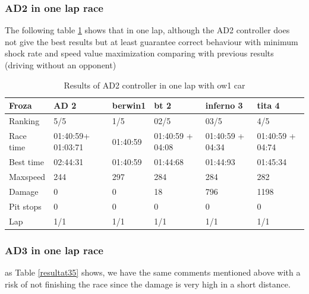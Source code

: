\documentclass{llncs}
\begin{document}
\subsubsection{AD2 in one lap race}	
The following table \ref{resultat32} shows that in one lap, although the AD2 controller does not give the best results but at least guarantee correct behaviour with minimum shock rate and speed value maximization comparing with previous results (driving without an opponent)
\begin{table}[h!]
	\caption{Results of AD2 controller in one lap with ow1 car}
	\label{resultat32}
	\begin{tabular}{ |p{3cm}|p{2cm}|p{2cm}|p{2 cm}|p{2 cm}|p{2 cm}|}
		\hline
		{ \color{blue}\textbf{Froza} }&
		{ \color{red} \textbf{ AD 2} } &
		{ \color{red}\textbf{ berwin1 }}&  
		{ \color{red} \textbf{bt 2 } } &
		
		{ \color{red} \textbf{inferno 3} }
		&{ \color{red} \textbf{tita 4} }
		\\
		\hline
		Ranking  & 5/5  & 1/5 & 02/5 & 03/5& 4/5
		\\
		\hline
		Race time &  01:40:59+ 01:03:71 & 01:40:59  &  01:40:59 + 04:08  &  01:40:59 + 04:34 &   01:40:59 + 04:74 
		\\
		\hline
		Best time & 02:44:31 &  01:40:59 & 01:44:68 & 01:44:93& 01:45:34
		\\
		\hline 
		Maxspeed & 244  & 297 & 284 & 284 & 282
		\\
		\hline
		
		Damage & 0 & 0 & 18 & 796 & 1198
		\\
		\hline 
		
		
		Pit stops & 0 & 0 & 0 & 0 & 0
		\\
		\hline 
		Lap & 1/1 & 1/1  & 1/1 & 1/1& 1/1 
		\\
		\hline	
	\end{tabular} 
	
	
	
\end{table}
\newpage

\subsubsection{AD3 in one lap race}	
as Table \ref {resultat35} shows, we have the same comments mentioned above with a risk of not finishing the race since the damage is very high in a short distance.
\end{document}
